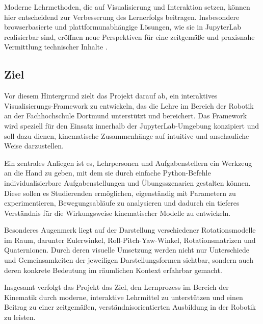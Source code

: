 Moderne Lehrmethoden, die auf Visualisierung und Interaktion setzen, können hier entscheidend zur Verbesserung des Lernerfolgs beitragen.
Insbesondere browserbasierte und plattformunabhängige Lösungen, wie sie in JupyterLab realisierbar sind,
eröffnen neue Perspektiven für eine zeitgemäße und praxisnahe Vermittlung technischer Inhalte .


\subsection{Ziel}
Vor diesem Hintergrund zielt das Projekt darauf ab, ein interaktives Visualisierungs-Framework zu entwickeln,
das die Lehre im Bereich der Robotik an der Fachhochschule Dortmund unterstützt und bereichert.
Das Framework wird speziell für den Einsatz innerhalb der JupyterLab-Umgebung konzipiert und soll dazu dienen,
kinematische Zusammenhänge auf intuitive und anschauliche Weise darzustellen.

Ein zentrales Anliegen ist es, Lehrpersonen und Aufgabenstellern ein Werkzeug an die Hand zu geben,
mit dem sie durch einfache Python-Befehle individualisierbare Aufgabenstellungen und Übungsszenarien gestalten können.
Diese sollen es Studierenden ermöglichen, eigenständig mit Parametern zu experimentieren,
Bewegungsabläufe zu analysieren und dadurch ein tieferes Verständnis für die Wirkungsweise kinematischer Modelle zu entwickeln.

Besonderes Augenmerk liegt auf der Darstellung verschiedener Rotationsmodelle im Raum,
darunter Eulerwinkel, Roll-Pitch-Yaw-Winkel, Rotationsmatrizen und Quaternionen.
Durch deren visuelle Umsetzung werden nicht nur Unterschiede und Gemeinsamkeiten der jeweiligen Darstellungsformen sichtbar,
sondern auch deren konkrete Bedeutung im räumlichen Kontext erfahrbar gemacht.

Insgesamt verfolgt das Projekt das Ziel, den Lernprozess im Bereich der Kinematik durch moderne,
interaktive Lehrmittel zu unterstützen und einen Beitrag zu einer zeitgemäßen, verständnisorientierten Ausbildung in der Robotik zu leisten.